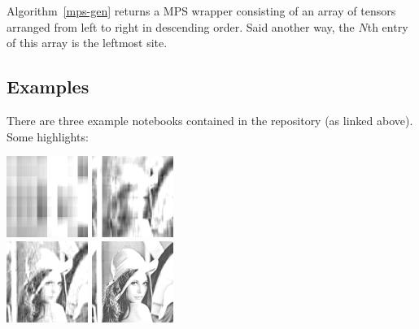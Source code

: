 \documentclass[12pt]{article}
\newenvironment{Figure}
  {\par\medskip\noindent\minipage{\linewidth}}
  {\endminipage\par\medskip}
\begin{document}
\begin{multicols}{2}
		Algorithm~\ref{mps-gen} returns a MPS wrapper consisting of an array of
		tensors arranged from left to right in descending order. Said another way,
		the $N$th entry of this array is the leftmost site.

	\subsection*{Examples}
	There are three example notebooks contained in the repository (as
	linked above). Some highlights:

	\begin{Figure}
		\center\includegraphics[height=100px]{./Figures/lenna-chi-2.png}
		\includegraphics[height=100px]{./Figures/lenna-chi-9.png}\\
		\includegraphics[height=100px]{./Figures/lenna-chi-20.png}
		\includegraphics[height=100px]{./Figures/lenna-chi-100.png}
		\label{lenna-compression}
	\end{Figure}


\end{multicols}
\end{document}
